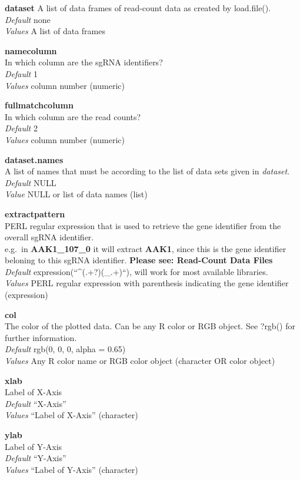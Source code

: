 \documentclass[]{article}
\begin{document}
\textbf{dataset} A list of data frames of read-count data as created by
load.file().\\
\emph{Default} none\\
\emph{Values} A list of data frames

\textbf{namecolumn}\\
In which column are the sgRNA identifiers?\\
\emph{Default} 1\\
\emph{Values} column number (numeric)

\textbf{fullmatchcolumn}\\
In which column are the read counts?\\
\emph{Default} 2\\
\emph{Values} column number (numeric)

\textbf{dataset.names}\\
A list of names that must be according to the list of data sets given in
\emph{dataset}.\\
\emph{Default} NULL\\
\emph{Value} NULL or list of data names (list)

\textbf{extractpattern}\\
PERL regular expression that is used to retrieve the gene identifier
from the overall sgRNA identifier.\\
e.g.~in \textbf{AAK1\_107\_0} it will extract \textbf{AAK1}, since this
is the gene identifier beloning to this sgRNA identifier. \textbf{Please
see: Read-Count Data Files}\\
\emph{Default} expression(``\^{}(.+?)(\_.+)``), will work for most
available libraries.\\
\emph{Values} PERL regular expression with parenthesis indicating the
gene identifier (expression)

\textbf{col}\\
The color of the plotted data. Can be any R color or RGB object. See
?rgb() for further information.\\
\emph{Default} rgb(0, 0, 0, alpha = 0.65)\\
\emph{Values} Any R color name or RGB color object (character OR color
object)

\textbf{xlab}\\
Label of X-Axis\\
\emph{Default} ``X-Axis''\\
\emph{Values} ``Label of X-Axis'' (character)

\textbf{ylab}\\
Label of Y-Axis\\
\emph{Default} ``Y-Axis''\\
\emph{Values} ``Label of Y-Axis'' (character)
\end{document}
